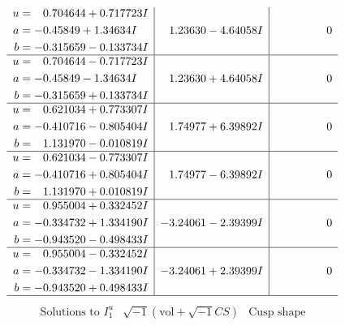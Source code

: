 \documentclass[1p]{elsarticle_modified}
\theoremstyle{definition}
\newcommand{\I}{\sqrt{-1}}
\begin{document}
$$\begin{array}{c|c|c}
\begin{aligned}
u &= \phantom{-}0.704644 + 0.717723 I \\
a &= -0.45849 + 1.34634 I \\
b &= -0.315659 - 0.133734 I\end{aligned}
 & \phantom{-}1.23630 - 4.64058 I & \phantom{-0.000000 } 0 \\ \hline\begin{aligned}
u &= \phantom{-}0.704644 - 0.717723 I \\
a &= -0.45849 - 1.34634 I \\
b &= -0.315659 + 0.133734 I\end{aligned}
 & \phantom{-}1.23630 + 4.64058 I & \phantom{-0.000000 } 0 \\ \hline\begin{aligned}
u &= \phantom{-}0.621034 + 0.773307 I \\
a &= -0.410716 - 0.805404 I \\
b &= \phantom{-}1.131970 - 0.010819 I\end{aligned}
 & \phantom{-}1.74977 + 6.39892 I & \phantom{-0.000000 } 0 \\ \hline\begin{aligned}
u &= \phantom{-}0.621034 - 0.773307 I \\
a &= -0.410716 + 0.805404 I \\
b &= \phantom{-}1.131970 + 0.010819 I\end{aligned}
 & \phantom{-}1.74977 - 6.39892 I & \phantom{-0.000000 } 0 \\ \hline\begin{aligned}
u &= \phantom{-}0.955004 + 0.332452 I \\
a &= -0.334732 + 1.334190 I \\
b &= -0.943520 - 0.498433 I\end{aligned}
 & -3.24061 - 2.39399 I & \phantom{-0.000000 } 0 \\ \hline\begin{aligned}
u &= \phantom{-}0.955004 - 0.332452 I \\
a &= -0.334732 - 1.334190 I \\
b &= -0.943520 + 0.498433 I\end{aligned}
 & -3.24061 + 2.39399 I & \phantom{-0.000000 } 0\\
 \hline 
 \end{array}$$\newpage$$\begin{array}{c|c|c}  
\text{Solutions to }I^u_{1}& \I (\text{vol} + \sqrt{-1}CS) & \text{Cusp shape}\\
 \hline 
\begin{aligned}

\end{aligned}
\end{array}$$
\end{document}
